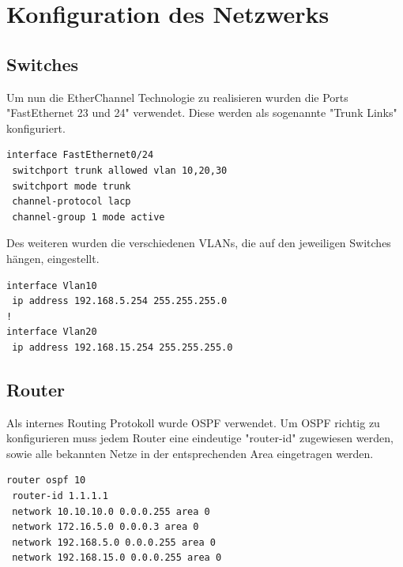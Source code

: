 \chapter{Konfiguration des Netzwerks}

\section{Switches}

Um nun die EtherChannel Technologie zu realisieren wurden die Ports "FastEthernet 23 und 24" verwendet. Diese werden als sogenannte "Trunk Links" konfiguriert.

\begin{lstlisting}[caption={Setting EtherChannel on a switch},label={lst:etherchannel},language={}]
interface FastEthernet0/24
 switchport trunk allowed vlan 10,20,30
 switchport mode trunk
 channel-protocol lacp
 channel-group 1 mode active
\end{lstlisting}

Des weiteren wurden die verschiedenen \ac{VLAN}s, die auf den jeweiligen Switches hängen, eingestellt.

\begin{lstlisting}[caption={VLAN Konfiguration auf Switch 1},label={lst:vlan},language={}]
interface Vlan10
 ip address 192.168.5.254 255.255.255.0
!
interface Vlan20
 ip address 192.168.15.254 255.255.255.0

\end{lstlisting}

\section{Router}

Als internes Routing Protokoll wurde \ac{OSPF} verwendet. Um \ac{OSPF} richtig zu konfigurieren muss jedem Router eine eindeutige "router-id" zugewiesen werden, sowie alle bekannten Netze in der entsprechenden Area eingetragen werden.

\begin{lstlisting}[caption={OSPF Konfiguration auf Router 1},label={lst:ospf},language={}]
router ospf 10
 router-id 1.1.1.1
 network 10.10.10.0 0.0.0.255 area 0
 network 172.16.5.0 0.0.0.3 area 0
 network 192.168.5.0 0.0.0.255 area 0
 network 192.168.15.0 0.0.0.255 area 0


\end{lstlisting}